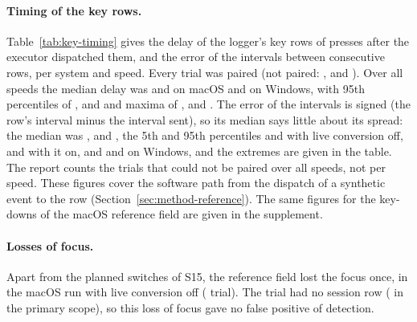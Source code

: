 \paragraph{Timing of the key rows.} Table~\ref{tab:key-timing} gives the delay of the logger's key rows of presses after
the executor dispatched them, and the error of the intervals between consecutive rows, per system and speed. Every
trial was paired (not paired: ,
 and ). Over all speeds the median
delay was  and 
on macOS and  on Windows, with 95th percentiles of
,  and
 and maxima of ,
 and . The error of the
intervals is signed (the row's interval minus the interval sent), so its median says little about its spread: the
median was ,
 and , the 5th
and 95th percentiles  and
 with live conversion off,
 and  with it
on, and  and  on Windows,
and the extremes are given in the table. The report counts the trials that could not be paired over all
speeds, not per speed. These figures cover the software path from the dispatch of a synthetic event to the row
(Section~\ref{sec:method-reference}). The same figures for the key-downs of the macOS reference field are given in the
supplement.

\paragraph{Losses of focus.} Apart from the planned switches of S15, the reference field lost the focus once, in the
macOS run with live conversion off ( trial). The trial had no
session row ( in the primary scope), so this loss of focus gave no false
positive of detection.

